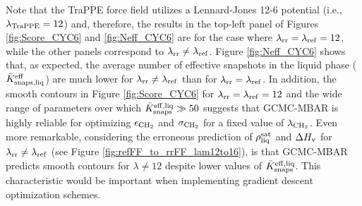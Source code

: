 \documentclass[journal=jced,manuscript=article]{achemso}
\begin{document}



Note that the TraPPE force field utilizes a Lennard-Jones 12-6 potential (i.e., $\lambda_{\rm TraPPE} = 12$) and, therefore, the results in the top-left panel of Figures \ref{fig:Score_CYC6} and \ref{fig:Neff_CYC6} are for the case where $\lambda_{\rm rr} = \lambda_{\rm ref} = 12$, while the other panels correspond to $\lambda_{\rm rr} \neq \lambda_{\rm ref}$. Figure \ref{fig:Neff_CYC6} shows that, as expected, the average number of effective snapshots in the liquid phase ($\bar K_{\rm snaps, liq}^{\rm eff}$) are much lower for $\lambda_{\rm rr} \neq \lambda_{\rm ref}$ than for $\lambda_{\rm rr} = \lambda_{\rm ref}$. In addition, the smooth contours in Figure \ref{fig:Score_CYC6} for $\lambda_{\rm rr} = \lambda_{\rm ref} = 12$ and the wide range of parameters over which $\bar K_{\rm snaps}^{\rm eff, liq} \gg 50$ suggests that GCMC-MBAR is highly reliable for optimizing $\epsilon_{\rm CH_2}$ and $\sigma_{\rm CH_2}$ for a fixed value of $\lambda_{\rm CH_2}$. Even more remarkable, considering the erroneous prediction of $\rho_{\rm liq}^{\rm sat}$ and $\Delta H_{\rm v}$ for $\lambda_{\rm rr} \neq \lambda_{\rm ref}$ (see Figure \ref{fig:refFF_to_rrFF_lam12to16}), is that GCMC-MBAR predicts smooth contours for $\lambda \neq 12$ despite lower values of $\bar K_{\rm snaps}^{\rm eff, liq}$. This characteristic would be important when implementing gradient descent optimization schemes.

\end{document}
